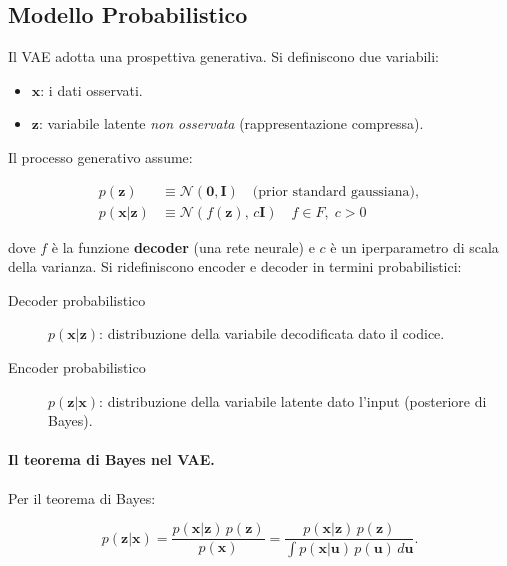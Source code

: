 \subsection{Modello Probabilistico}
\label{subsec:vae-probabilistic}

Il VAE \citep{kingma2014vae} adotta una prospettiva generativa. Si
definiscono due variabili:

\begin{itemize}
  \item $\mathbf{x}$: i dati osservati.
  \item $\mathbf{z}$: variabile latente \emph{non osservata} (rappresentazione
        compressa).
\end{itemize}

Il processo generativo assume:

\begin{align}
  p(\mathbf{z}) &\equiv \mathcal{N}(\mathbf{0}, \mathbf{I})
    \quad \text{(prior standard gaussiana)},
  \label{eq:vae-prior} \\
  p(\mathbf{x}|\mathbf{z}) &\equiv \mathcal{N}(f(\mathbf{z}),\, c\mathbf{I})
    \quad f \in F,\; c > 0
  \label{eq:vae-likelihood}
\end{align}

dove $f$ è la funzione \textbf{decoder} (una rete neurale) e $c$ è un
iperparametro di scala della varianza. Si ridefiniscono encoder e decoder
in termini probabilistici:

\begin{description}
  \item[Decoder probabilistico] $p(\mathbf{x}|\mathbf{z})$: distribuzione
        della variabile decodificata dato il codice.
  \item[Encoder probabilistico] $p(\mathbf{z}|\mathbf{x})$: distribuzione
        della variabile latente dato l'input (posteriore di Bayes).
\end{description}

\paragraph{Il teorema di Bayes nel VAE.}
Per il teorema di Bayes:

\begin{equation}
  p(\mathbf{z}|\mathbf{x}) = \frac{p(\mathbf{x}|\mathbf{z})\,p(\mathbf{z})}{p(\mathbf{x})}
  = \frac{p(\mathbf{x}|\mathbf{z})\,p(\mathbf{z})}{\displaystyle\int p(\mathbf{x}|\mathbf{u})\,p(\mathbf{u})\,d\mathbf{u}}.
  \label{eq:bayes-vae}
\end{equation}


